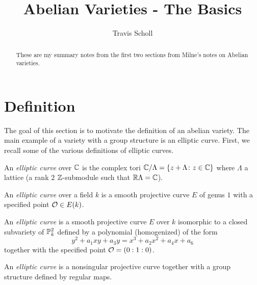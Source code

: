 \documentclass[11pt]{article}
\newcommand{\mytitle}{Abelian Varieties - The Basics}
\newcommand{\myauthor}{Travis Scholl}
\begin{document}
\title{\mytitle}
\author{\sc \myauthor }
\maketitle

\begin{abstract}
	These are my summary notes from the first two sections from Milne's notes \cite{milneAV} on Abelian varieties.
\end{abstract}

\section{Definition}

The goal of this section is to motivate the definition of an abelian variety. The main example of a variety with a group structure is an elliptic curve. First, we recall some of the various definitions of elliptic curves.

\begin{defn}\label{def:ec_tori}
	An \emph{elliptic curve} over $\mathbb{C}$ is the complex tori $\mathbb{C}/\Lambda = \{z+\Lambda \colon z\in\mathbb{C}\}$ where $\Lambda$ a lattice (a rank $2$ $\mathbb{Z}$-submodule such that $\mathbb{R}\Lambda = \mathbb{C}$).
\end{defn}

\begin{defn}\label{def:ec_genus}
	An \emph{elliptic curve} over a field $k$ is a smooth projective curve $E$ of genus $1$ with a specified point $\mathcal{O}\in E(k)$.
\end{defn}

\begin{defn}\label{def:ec_weirstras}
	An \emph{elliptic curve} is a smooth projective curve $E$ over $k$ isomorphic to a closed subvariety of $\mathbb{P}_k^2$ defined by a polynomial (homogenized) of the form
	$$
	y^2 + a_1xy + a_3y = x^3 + a_2x^2 + a_4x + a_6
	$$
	together with the specified point $\mathcal{O} = (0:1:0)$.
\end{defn}

\begin{defn}\label{def:ec_gp}
	An \emph{elliptic curve} is a nonsingular projective curve together with a group structure defined by regular maps.
\end{defn}
\end{document}
